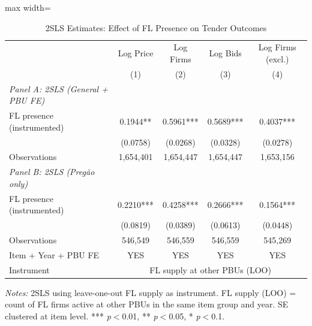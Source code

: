 \begin{table}[htbp]
\centering
\caption{2SLS Estimates: Effect of FL Presence on Tender Outcomes}
\label{tab:iv_main}
\begin{adjustbox}{max width=\textwidth}
\begin{threeparttable}
\small
\begin{tabular}{lcccc}
\toprule
 & Log Price & Log Firms & Log Bids & Log Firms (excl.) \\
 & (1) & (2) & (3) & (4) \\
\midrule
\textit{Panel A: 2SLS (General + PBU FE)} & & & & \\
FL presence (instrumented) & 0.1944** & 0.5961*** & 0.5689*** & 0.4037*** \\
 & (0.0758) & (0.0268) & (0.0328) & (0.0278) \\
Observations & 1,654,401 & 1,654,447 & 1,654,447 & 1,653,156 \\
\midrule
\textit{Panel B: 2SLS (Preg\~{a}o only)} & & & & \\
FL presence (instrumented) & 0.2210*** & 0.4258*** & 0.2666*** & 0.1564*** \\
 & (0.0819) & (0.0389) & (0.0613) & (0.0448) \\
Observations & 546,549 & 546,559 & 546,559 & 545,269 \\
\midrule
Item + Year + PBU FE & YES & YES & YES & YES \\
Instrument & \multicolumn{4}{c}{FL supply at other PBUs (LOO)} \\
\bottomrule
\end{tabular}
\begin{tablenotes}
\small
\item \textit{Notes:} 2SLS using leave-one-out FL supply as instrument.
FL supply (LOO) = count of FL firms active at other PBUs in the same item
group and year. SE clustered at item level.
*** \textit{p}$<$0.01, ** \textit{p}$<$0.05, * \textit{p}$<$0.1.
\end{tablenotes}
\end{threeparttable}
\end{adjustbox}
\end{table}
